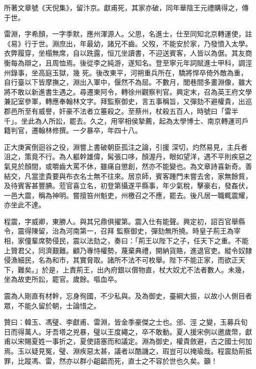 \begin{pinyinscope}
 所著文章號《天倪集》，留汴京。獻甫死，其家亦破，同年華陰王元禮購得之，傳于世。



 雷淵，字希顏，一字季默，應州渾源人。父思，名進士，仕至同知北京轉運使，註《易》行于世。淵庶出，年最幼，諸兄不齒。父歿，不能安於家，乃發憤入太學。衣弊履穿，坐榻無席，自以跣露，恒兀坐讀書，不迎送賓客，人皆以為倨。其友商衡每為辯之，且周恤焉。後從李之純游，遂知名。登至寧元年詞賦進士甲科，調涇州錄事，坐高庭玉獄，幾
 死。後改東平，河朔重兵所在，驕將悍卒倚外敵為重，自行臺以下皆摩撫之，淵出入軍中，偃然不為屈。不數月，閭巷間多畫淵像，雖大將不敢以新進書生遇之。尋遷東阿令，轉徐州觀察判官。興定末，召為英王府文學兼記室參軍，轉應奉翰林文字。拜監察御史，言五事稱旨，又彈劾不避權貴，出巡郡邑所至有威譽，奸豪不法者立箠殺之。至蔡州，杖殺五百人，時號曰「雷半千」。坐此為人所訟，罷去。久之，用宰相侯摯薦，起為太學博士、南京轉運司戶籍判官，遷翰林修撰。一夕暴卒，年四十八。



 正大庚寅倒迴谷之役，淵嘗上書破朝臣孤注之論，引援
 深切，灼然易見，主兵者沮之，策竟不行。為人軀幹雄偉，髯張口哆，顏渥丹，眼如望洋，遇不平則疾惡之氣見於顏間，或嚼齒大罵不休，雖痛自懲創，然亦不能變也。為文章詩喜新奇。善結交，凡當塗貴要與布衣名士無不往來。居京師，賓客踵門未嘗去舍，家無餘貲，及待賓客甚豐腆。蒞官喜立名，初登第攝遂平縣事，年少氣稅，擊豪右，發姦伏，一邑大震，稱為神明。嘗擅笞州魁吏，州檄召之不應，罷去。後凡居一職輒震耀，亦坐此不達。



 程震，字威卿，東勝人。與其兄鼎俱擢第。震入仕有能聲。興定初，詔百官舉縣令，震得陳留，治為河南第一，召拜
 監察御史，彈劾無所撓。時皇子荊王為宰相，家僮輩席勢侵民，震以法劾之，奏曰：「荊王以陛下之子，任天下之重。不能上贊君父，同濟艱難。顧乃專恃權勢，蔑棄典禮，開納貨賂，進退官吏。縱令奴隸侵漁細民，名為和市，其實脅取。諸所不法不可枚舉。陛下不能正家，而欲正天下，難矣。」於是，上責荊王，出內府銀以償物直，杖大奴尤不法者數人。未幾，坐為故吏所訟，罷官。歲餘。嘔血卒。



 震為人剛直有材幹，忘身徇國，不少私與。及為御史，臺綱大振，以故小人側目者眾，不能久留於朝，士論惜之。



 贊曰：韓玉、馮璧、李獻甫、雷淵，皆金季豪傑之士也。邠、涇
 之變，玉募兵旬日而得萬人。牙吾塔之兇暴，璧以王度繩之，卒不敢動。夏人援宋例以邀歲幣，獻甫以宋賜夏姓一事折之，夏使語塞而和議定。淵為御史，權貴斂避，古之國士何加焉。玉以疑見冤，璧、淵疾惡太甚，議者以酷譏之，瑕豈可以掩瑜哉。程震劾荊抵罪，比蹤馮、雷，然亦以群小齟齬而死，直士之不容於世也久矣。籲！



\end{pinyinscope}